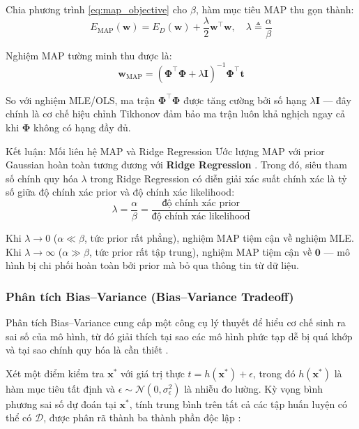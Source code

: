 Chia phương trình \eqref{eq:map_objective} cho $\beta$, hàm mục tiêu MAP 
thu gọn thành:
$$E_{\mathrm{MAP}}(\boldsymbol{w}) 
  = E_D(\boldsymbol{w}) + \frac{\lambda}{2}\boldsymbol{w}^{\top}\boldsymbol{w}, 
  \quad \lambda \triangleq \frac{\alpha}{\beta}$$

Nghiệm MAP tường minh thu được là:
$$\boldsymbol{w}_{\mathrm{MAP}} 
  = \left(\boldsymbol{\Phi}^{\top}\boldsymbol{\Phi} 
    + \lambda\mathbf{I}\right)^{-1}\boldsymbol{\Phi}^{\top}\boldsymbol{t}$$

So với nghiệm MLE/OLS, ma trận $\boldsymbol{\Phi}^{\top}\boldsymbol{\Phi}$ được 
tăng cường bởi số hạng $\lambda\mathbf{I}$ --- đây chính là cơ chế hiệu 
chỉnh Tikhonov đảm bảo ma trận luôn khả nghịch ngay cả 
khi $\boldsymbol{\Phi}$ không có hạng đầy đủ.

\begin{importantbox}{Kết luận: Mối liên hệ MAP và Ridge Regression}
Ước lượng MAP với prior Gaussian hoàn toàn tương đương với 
\textbf{Ridge Regression} \cite{bishop2006pattern}. Trong đó, 
siêu tham số chính quy hóa $\lambda$ trong Ridge Regression có diễn giải xác suất 
chính xác là tỷ số giữa độ chính xác prior và độ chính xác likelihood:
$$\lambda = \frac{\alpha}{\beta} 
  = \frac{\text{độ chính xác prior}}{\text{độ chính xác likelihood}}$$
\end{importantbox}

Khi $\lambda \to 0$ ($\alpha \ll \beta$, tức prior rất phẳng), nghiệm MAP 
tiệm cận về nghiệm MLE. Khi $\lambda \to \infty$ ($\alpha \gg \beta$, tức prior 
rất tập trung), nghiệm MAP tiệm cận về $\boldsymbol{0}$ --- mô hình bị chi phối 
hoàn toàn bởi prior mà bỏ qua thông tin từ dữ liệu.

\subsubsection{Phân tích Bias--Variance (Bias--Variance Tradeoff)}
\label{sec:bias_variance}

Phân tích Bias--Variance cung cấp một công cụ lý thuyết để hiểu cơ chế sinh ra 
sai số của mô hình, từ đó giải thích tại sao các mô hình phức tạp dễ bị quá khớp 
và tại sao chính quy hóa là cần thiết \cite{bishop2006pattern}.

Xét một điểm kiểm tra $\boldsymbol{x}^*$ với giá trị thực $t = h(\boldsymbol{x}^*) 
+ \epsilon$, trong đó $h(\boldsymbol{x}^*)$ là hàm mục tiêu tất định 
và $\epsilon \sim \mathcal{N}(0, \sigma_\epsilon^2)$ là nhiễu đo 
lường. Kỳ vọng bình phương sai số dự đoán tại 
$\boldsymbol{x}^*$, tính trung bình trên tất cả các tập huấn luyện có thể có 
$\mathcal{D}$, được phân rã thành ba thành phần độc lập \cite{bishop2006pattern}:

